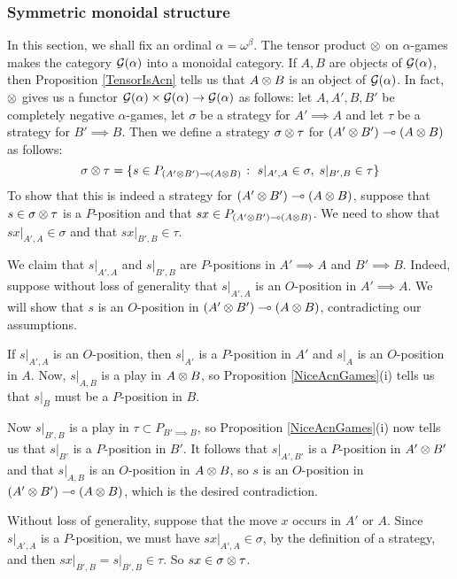 \documentclass[11pt]{article} %
\begin{document}
\subsubsection{Symmetric monoidal structure}

In this section, we shall fix an ordinal $\alpha=\omega^\beta$.  The tensor product $\otimes$ on $\alpha$-games makes the category $\mathcal G(\alpha)$ into a monoidal category.  If $A,B$ are objects of $\mathcal G(\alpha)$, then Proposition \ref{TensorIsAcn} tells us that $A\otimes B$ is an object of $\mathcal G(\alpha)$.  In fact, $\otimes$ gives us a functor $\mathcal G(\alpha)\times\mathcal G(\alpha)\to\mathcal G(\alpha)$ as follows: let $A,A',B,B'$ be completely negative $\alpha$-games, let $\sigma$ be a strategy for $A'\implies A$ and let $\tau$ be a strategy for $B'\implies B$.  Then we define a strategy $\sigma\otimes\tau$ for $(A'\otimes B')\multimap (A\otimes B)$ as follows:
\[
  \sigma\otimes\tau = \{s\in P_{(A'\otimes B')\multimap(A\otimes B)}\;\colon\; s\vert_{A',A}\in\sigma,\;s\vert_{B',B}\in\tau\}
  \]
To show that this is indeed a strategy for $(A'\otimes B')\multimap (A\otimes B)$, suppose that $s\in\sigma\otimes\tau$ is a $P$-position and that $sx\in P_{(A'\otimes B')\multimap (A\otimes B)}$.  We need to show that $sx\vert_{A',A}\in\sigma$ and that $sx\vert_{B', B}\in\tau$.  

We claim that $s\vert_{A',A}$ and $s\vert_{B',B}$ are $P$-positions in $A'\implies A$ and $B'\implies B$.  Indeed, suppose without loss of generality that $s\vert_{A',A}$ is an $O$-position in $A'\implies A$.  We will show that $s$ is an $O$-position in $(A'\otimes B')\multimap (A\otimes B)$, contradicting our assumptions.

If $s\vert_{A',A}$ is an $O$-position, then $s\vert_{A'}$ is a $P$-position in $A'$ and $s\vert_A$ is an $O$-position in $A$.  Now, $s\vert_{A,B}$ is a play in $A\otimes B$, so Proposition \ref{NiceAcnGames}(i) tells us that $s\vert_B$ must be a $P$-position in $B$.  

Now $s\vert_{B',B}$ is a play in $\tau\subset P_{B'\implies B}$, so Proposition \ref{NiceAcnGames}(i) now tells us that $s\vert_{B'}$ is a $P$-position in $B'$.  It follows that $s\vert_{A',B'}$ is a $P$-position in $A'\otimes B'$ and that $s\vert_{A,B}$ is an $O$-position in $A\otimes B$, so $s$ is an $O$-position in $(A'\otimes B')\multimap (A\otimes B)$, which is the desired contradiction.

Without loss of generality, suppose that the move $x$ occurs in $A'$ or $A$.  Since $s\vert_{A', A}$ is a $P$-position, we must have $sx\vert_{A',A}\in\sigma$, by the definition of a strategy, and then $s x\vert_{B',B}=s\vert_{B',B}\in\tau$.  So $sx\in\sigma\otimes\tau$.
\end{document}
